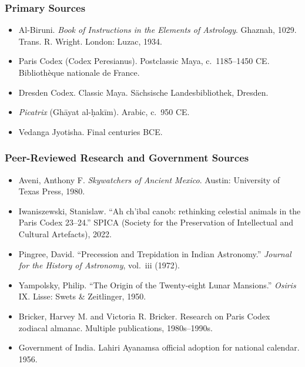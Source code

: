 \documentclass[11pt,letterpaper]{article}
\begin{document}
\subsubsection*{Primary Sources}
\begin{itemize}[leftmargin=1.5em]
  \item Al-Biruni. \textit{Book of Instructions in the Elements of Astrology}. Ghaznah, 1029. Trans. R. Wright. London: Luzac, 1934.
  \item Paris Codex (Codex Peresianus). Postclassic Maya, c.~1185--1450 CE. Bibliothèque nationale de France.
  \item Dresden Codex. Classic Maya. Sächsische Landesbibliothek, Dresden.
  \item \textit{Picatrix} (Ghāyat al-ḥakīm). Arabic, c.~950 CE.
  \item Vedanga Jyotisha. Final centuries BCE.
\end{itemize}

\subsubsection*{Peer-Reviewed Research and Government Sources}
\begin{itemize}[leftmargin=1.5em]
  \item Aveni, Anthony F. \textit{Skywatchers of Ancient Mexico}. Austin: University of Texas Press, 1980.
  \item Iwaniszewski, Stanislaw. ``Ah ch'ibal canob: rethinking celestial animals in the Paris Codex 23--24.'' SPICA (Society for the Preservation of Intellectual and Cultural Artefacts), 2022.
  \item Pingree, David. ``Precession and Trepidation in Indian Astronomy.'' \textit{Journal for the History of Astronomy}, vol.~iii (1972).
  \item Yampolsky, Philip. ``The Origin of the Twenty-eight Lunar Mansions.'' \textit{Osiris} IX. Lisse: Swets \& Zeitlinger, 1950.
  \item Bricker, Harvey M. and Victoria R. Bricker. Research on Paris Codex zodiacal almanac. Multiple publications, 1980s--1990s.
  \item Government of India. Lahiri Ayanamsa official adoption for national calendar. 1956.
\end{itemize}
\end{document}
